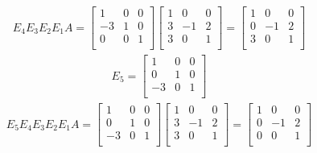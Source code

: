 \documentclass[12pt]{article}
\begin{document}
\begin{enumerate}
    \begin{align*}
      E_4E_3E_2E_1A =
      \begin{bmatrix}
         1 &  0 & 0\\
        -3 &  1 & 0\\
         0 &  0 & 1\\
      \end{bmatrix}
      \begin{bmatrix}
        1 &  0 & 0\\
        3 & -1 & 2\\
        3 &  0 & 1\\
      \end{bmatrix}
      =
      \begin{bmatrix}
        1 &  0 & 0\\
        0 & -1 & 2\\
        3 &  0 & 1\\
      \end{bmatrix}
    \end{align*}
    \begin{align*}
      E_5 =
      \begin{bmatrix}
         1 &  0 & 0\\
         0 &  1 & 0\\
        -3 &  0 & 1\\
      \end{bmatrix}
    \end{align*}
    \begin{align*}
      E_5E_4E_3E_2E_1A =
      \begin{bmatrix}
         1 &  0 & 0\\
         0 &  1 & 0\\
        -3 &  0 & 1\\
      \end{bmatrix}
      \begin{bmatrix}
        1 &  0 & 0\\
        3 & -1 & 2\\
        3 &  0 & 1\\
      \end{bmatrix}
      =
      \begin{bmatrix}
        1 &  0 & 0\\
        0 & -1 & 2\\
        0 &  0 & 1\\
      \end{bmatrix}
    \end{align*}
    \begin{align*}

\end{align*}
\end{enumerate}
\end{document}
